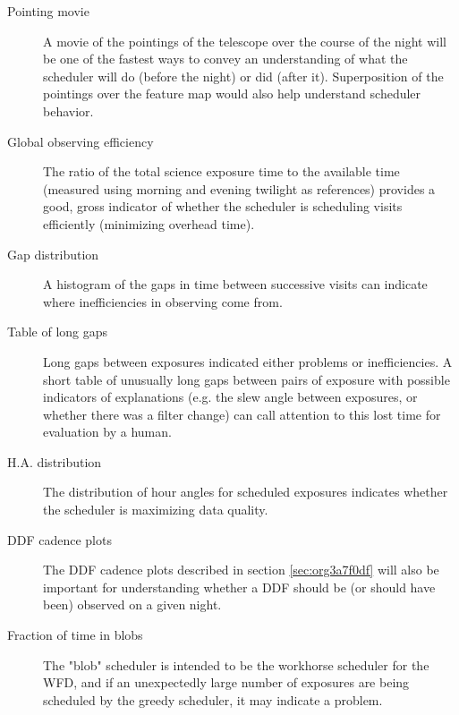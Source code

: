 \begin{description}
\item[{Pointing movie}] A movie of the pointings of the telescope over the course of the night will be one of the fastest ways to convey an understanding of what the scheduler will do (before the night) or did (after it). Superposition of the pointings over the feature map would also help understand scheduler behavior.
\item[{Global observing efficiency}] The ratio of the total science exposure time to the available time (measured using morning and evening twilight as references) provides a good, gross indicator of whether the scheduler is scheduling visits efficiently (minimizing overhead time).
\item[{Gap distribution}] A histogram of the gaps in time between successive visits can indicate where inefficiencies in observing come from.
\item[{Table of long gaps}] Long gaps between exposures indicated either problems or inefficiencies. A short table of unusually long gaps between pairs of exposure with possible indicators of explanations (e.g. the slew angle between exposures, or whether there was a filter change) can call attention to this lost time for evaluation by a human.
\item[{H.A. distribution}] The distribution of hour angles for scheduled exposures indicates whether the scheduler is maximizing data quality.
\item[{DDF cadence plots}] The DDF cadence plots described in section \ref{sec:org3a7f0df} will also be important for understanding whether a DDF should be (or should have been) observed on a given night.
\item[{Fraction of time in blobs}] The "blob" scheduler is intended to be the workhorse scheduler for the WFD, and if an unexpectedly large number of exposures are being scheduled by the greedy scheduler, it may indicate a problem.
\end{description}

